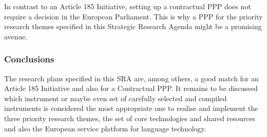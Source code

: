 \documentclass[10pt, plain]{../../metanetpaper}
\begin{document}
\begin{multicols}{2}
In contrast to an Article 185 Initiative, setting up a contractual PPP does not require a decision in the European Parliament. This is why a PPP for the priority research themes specified in this Strategic Research Agenda might be a promising avenue.  

\subsubsection{Conclusions}
\label{sec:funding-conclusions}

The research plans specified in this SRA are, among others, a good match for an Article 185 Initiative and also for a Contractual PPP. It remains to be discussed which instrument or maybe even set of carefully selected and compiled instruments is considered the most appropriate one to realise and implement the three priority research themes, the set of core technologies and shared resources and also the European service platform for language technology.


\end{multicols}

\clearpage


\appendix
{}





\clearpage

\end{document}
